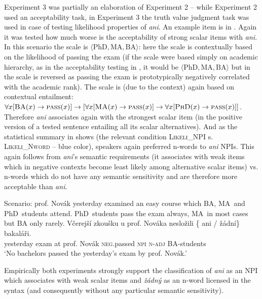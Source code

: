 \documentclass[output=paper,
]{langscibook}
\begin{document}
Experiment 3 was partially an elaboration of Experiment 2 -- while Experiment 2 used an acceptability task, in Experiment 3 the truth value judgment task was used in case of testing likelihood properties of \textit{ani}. An example item is in . Again it was tested how much worse is the acceptability of strong scalar items with \textit{ani}. In this scenario the scale is $\langle \text{PhD}, \text{MA}, \text{BA}\rangle$: here the scale is contextually based on the likelihood of passing the exam (if the scale were based simply on academic hierarchy, as in the acceptability testing in , it would be $\langle \text{PhD}, \text{MA}, \text{BA}\rangle$ but in  the scale is reversed as passing the exam is prototypically negatively correlated with the academic rank). The scale is (due to the context) again based on contextual entailment: $\forall x[\textsc{BA}(x) \rightarrow  \textsc{pass}(x)] \rightarrow [\forall x[\textsc{MA}(x) \rightarrow \textsc{pass}(x)] \rightarrow \forall x[\textsc{PhD}(x) \rightarrow \textsc{pass}(x)]]$. Therefore \textit{ani} associates again with the strongest scalar item (in the positive version of a tested sentence entailing all its scalar alternatives). And as the statistical summary in  shows (the relevant condition \textsc{Likeli\_NPI} s. \textsc{Likeli\_Nword} -- blue color), speakers again preferred n-words to \textit{ani} NPIs.  This again follows from \textit{ani}'s semantic requirements (it associates with weak items which in negative contexts become least likely among alternative scalar items)  vs. n-words which do not have any semantic sensitivity and are therefore more acceptable than \textit{ani}.

\eanoraggedright\label{ex-43} Scenario: prof. Novák yesterday examined an easy course which BA, MA~and PhD~students attend. PhD~students pass the exam always, MA~in most cases but BA only rarely.
\ea \gll Včerejší zkoušku u prof. Nováka nesložili \{\hspace{-2pt} ani / žádní\} bakaláři.\\
yesterday exam at prof. Novák \textsc{neg}.passed {} \textsc{npi} {} \textsc{n-adj} BA-students\\
\glt `No bachelors passed the yesterday's exam by prof. Novák.'
\z
\z


\noindent Empirically both experiments strongly support the classification of \textit{ani} as an NPI which associates with weak scalar items and \textit{žádný} as an n-word licensed in the syntax (and consequently without any particular semantic sensitivity).
\end{document}
